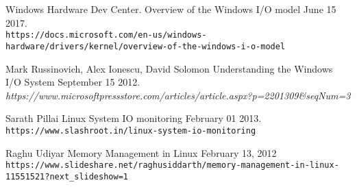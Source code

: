 \documentclass[onecolumn, draftclsnofoot,10pt, compsoc]{IEEEtran}
\begin{document}
	
\newpage
\begin{thebibliography}{10}
	Windows Hardware Dev Center.
	Overview of the Windows I/O model
	June 15 2017.
	\\\texttt{https://docs.microsoft.com/en-us/windows-hardware/drivers/kernel/overview-of-the-windows-i-o-model}

	Mark Russinovich, Alex Ionescu, David Solomon
	Understanding the Windows I/O System
	September 15 2012.
	\\\textit{https://www.microsoftpressstore.com/articles/article.aspx?p=2201309\&seqNum=3}

    Sarath Pillai
	Linux System IO monitoring
	February 01 2013.
	\\\texttt{https://www.slashroot.in/linux-system-io-monitoring}

    Raghu Udiyar
	Memory Management in Linux
	February 13, 2012
	\\\texttt{https://www.slideshare.net/raghusiddarth/memory-management-in-linux-11551521?next\_slideshow=1}
	
	

















\end{thebibliography}
\end{document}
